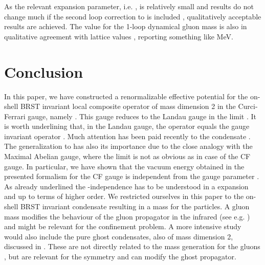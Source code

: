 \documentclass[a4paper,12pt]{article}
\providecommand{\text}{\textrm}
\providecommand{\sect}[1]{ \section{#1} \setcounter{equation}{0} }
\begin{document}
As the relevant expansion parameter, i.e. \coordHE{}, is
relatively small and results do not change much if the second loop
correction to \coordHE{} is included \cite{v1}, qualitatively
acceptable
results are achieved. The value for the 1-loop dynamical gluon mass \myHighlight{$m_{%
\text{{\tiny {gluon}}}}$}\coordHE{} is also in qualitative agreement with lattice
values \cite{Langfeld:2001cz,Alexandrou:2001fh}, reporting something like \myHighlight{$%
m_{\text{{\tiny {gluon}}}}\sim 600$}\coordHE{} MeV.

\sect{Conclusion}

\label{sec6} In this paper, we have constructed a renormalizable
effective potential for the on-shell BRST invariant local
composite operator of mass dimension 2 in the Curci-Ferrari gauge,
namely \coordHE{}. This gauge reduces to the Landau gauge in
the limit \coordHE{}. It is worth underlining that, in the Landau
gauge, the operator \coordHE{} equals the gauge invariant
operator \coordHE{}. Much attention has been paid recently to the
condensate \coordHE{}. The generalization
to \coordHE{} has also its importance due to the close
analogy with the Maximal Abelian gauge, where the \coordHE{} limit is not as obvious as in case of the CF gauge.
In particular, we have shown that the vacuum energy obtained in
the presented formalism for the CF gauge is independent from the
gauge parameter \myHighlight{$\alpha $}\coordHE{}. As already underlined the \myHighlight{$\alpha
$}\coordHE{}-independence has to be understood in a \coordHE{} expansion and up
to terms of higher order.\newline
\newline
We restricted ourselves in this paper to the on-shell BRST
invariant condensate resulting in a mass for the particles. A
gluon mass modifies the behaviour of the gluon propagator in the
infrared (see e.g. \cite{Langfeld:2001cz}) and might be relevant
for the confinement problem. A more intensive study would also
include the pure ghost condensates, also of mass dimension 2,
discussed in \cite
{Dudal:2002ye,Lemes:2002rc,Dudal:2002xe,Kondo:2000ey,Schaden:1999ew,Lemes:2002ey,Lemes:2002jv}.
These are not directly related to the mass generation for the
gluons \cite{Dudal:2002ye,Dudal:2002xe}, but are relevant for the
\coordHE{} symmetry and can modify the ghost propagator.
\end{document}
